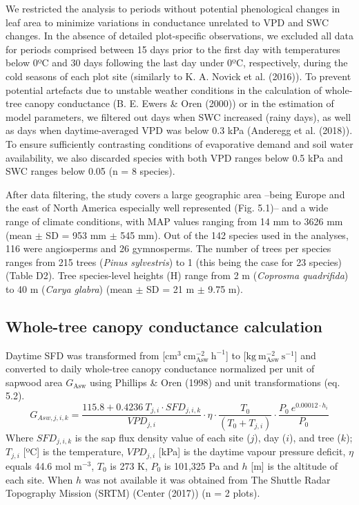 \documentclass[11pt,twoside]{reedthesis}
\begin{document}
We restricted the analysis to periods without potential phenological
changes in leaf area to minimize variations in conductance unrelated to
VPD and SWC changes. In the absence of detailed plot-specific
observations, we excluded all data for periods comprised between 15 days
prior to the first day with temperatures below 0ºC and 30 days following
the last day under 0ºC, respectively, during the cold seasons of each
plot site (similarly to K. A. Novick et al. (2016)). To prevent
potential artefacts due to unstable weather conditions in the
calculation of whole-tree canopy conductance (B. E. Ewers \& Oren
(2000)) or in the estimation of model parameters, we filtered out days
when SWC increased (rainy days), as well as days when daytime-averaged
VPD was below 0.3 kPa (Anderegg et al. (2018)). To ensure sufficiently
contrasting conditions of evaporative demand and soil water
availability, we also discarded species with both VPD ranges below 0.5
kPa and SWC ranges below 0.05 (n = 8 species).\par

After data filtering, the study covers a large geographic area --being
Europe and the east of North America especially well represented (Fig.
5.1)-- and a wide range of climate conditions, with MAP values ranging
from 14 mm to 3626 mm (mean \(\pm\) SD = 953 mm \(\pm\) 545 mm). Out of
the 142 species used in the analyses, 116 were angiosperms and 26
gymnosperms. The number of trees per species ranges from 215 trees
(\emph{Pinus sylvestris}) to 1 (this being the case for 23 species)
(Table D2). Tree species-level heights (H) range from 2 m
(\emph{Coprosma quadrifida}) to 40 m (\emph{Carya glabra}) (mean \(\pm\)
SD = 21 m \(\pm\) 9.75 m).\par

\subsection{Whole-tree canopy conductance
calculation}\label{whole-tree-canopy-conductance-calculation}

Daytime SFD was transformed from
{[}\(\text{cm}^3 \: \text{cm}_{\text{Asw}}^{-2} \: \text{h}^{-1}\){]} to
{[}\(\text{kg} \: \text{m}_{\text{Asw}}^{-2} \: \text{s}^{-1}\){]} and
converted to daily whole-tree canopy conductance normalized per unit of
sapwood area \(G_{\text{Asw}}\) using Phillips \& Oren (1998) and unit
transformations (eq. 5.2).
\begin{equation}
G_{Asw,j,i,k} = \frac{115.8 + 0.4236 \: T_{j , i} \cdot SFD_{j , i , k}}{VPD_{j,i}}\cdot \eta \cdot \frac{T_0}{(T_0 + T_{j,i})} \cdot \frac{P_0 \: e^{0.00012 \cdot h_i}}{P_0}
\end{equation}
Where \(SFD_{j,i,k}\) is the sap flux density value of each site
(\(j\)), day (\(i\)), and tree (\(k\)); \({T}_{j,i}\) {[}ºC{]} is the
temperature, \(VPD_{j,i}\) {[}kPa{]} is the daytime vapour pressure
deficit, \(\eta\) equals 44.6 mol \(\text{m}^{-3}\), \(T_0\) is 273 K,
\(P_0\) is 101,325 Pa and \(h\) {[}m{]} is the altitude of each site.
When \(h\) was not available it was obtained from The Shuttle Radar
Topography Mission (SRTM) (Center (2017)) (n = 2 plots).\par
\end{document}

